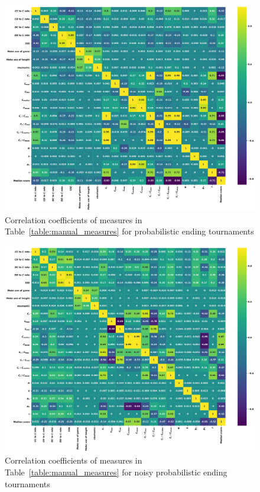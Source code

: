 \documentclass{article}
\begin{document}
\begin{figure}[!htbp]
    \begin{center}
        \includegraphics[width=.75\linewidth]{../images/probend_correlation_plot.pdf}
    \end{center}
    \caption{Correlation coefficients of measures in Table~\ref{table:manual_measures}
    for probabilistic ending tournaments}
\end{figure}
\begin{figure}[!htbp]
    \begin{center}
        \includegraphics[width=.75\linewidth]{../images/probend_noise_correlation_plot.pdf}
    \end{center}
    \caption{Correlation coefficients of measures in Table~\ref{table:manual_measures}
    for noisy probabilistic ending tournaments}
\end{figure}
\end{document}
